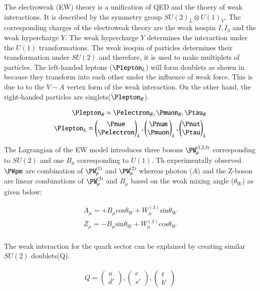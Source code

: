 The electroweak (EW) theory is a unification of QED and the thoery of weak interactions. 
It is described by the symmetry group $SU(2)_L \otimes U(1)_Y$. The corresponding
charges of the electroweak theory are the weak isospin $I,I_3$ and the weak hypercharge $Y$.
The weak hypercharge $Y$ determines the interaction under the $U(1)$ transformations.
The weak isospin of particles determines their transformation under $SU(2)$ and therefore, it is
used to make multiplets of particles. The left-handed leptons ($\Plepton_L$) will form doublets
as shown in  because they transform into each other under the influence of weak force. 
This is due to to the $V-A$ vertex form of the weak interaction. On the other hand, the right-handed 
particles are singlets($\Plepton_R$). 

\begin{align*}
    \Plepton_R = \Pelectron_R, \Pmuon_R, \Ptau_R \\
    \Plepton_L = \begin{pmatrix} \Pnue \\ \Pelectron \end{pmatrix}_L , \begin{pmatrix} \Pnum \\ \Pmuon \end{pmatrix}_L , \begin{pmatrix} \Pnut \\ \Ptau \end{pmatrix}_L 
\end{align*}

The Lagrangian of the EW model introduces three bosons $\PW_\mu^{(1,2,3)}$ corresponding
to $SU(2)$ and one $B_\mu$ corresponding to $U(1)$. Th experimentally observed $\PWpm$
are combination of $\PW_\mu^{(1)}$ and $\PW_\mu^{(2)}$ whereas photon ($A$) and the Z-boson are linear
combinations of $\PW_\mu^{(3)}$ and $B_\mu$ based on the weak mixing angle ($\theta_W$)
as given below:

\begin{align*}
A_\mu = +B_\mu \text{cos} \theta_W + W_\mu^{(3)}\text{sin} \theta_W \\
Z_\mu = -B_\mu \text{sin} \theta_W + W_\mu^{(3)}\text{cos} \theta_W \\
\end{align*}

The weak interaction for the quark sector can be explained by creating similar
$SU(2)$ doublets(Q).

\begin{align*}
    Q = \begin{pmatrix} u \\ d' \end{pmatrix}, \begin{pmatrix} c \\ s' \end{pmatrix}, \begin{pmatrix} t \\ b' \end{pmatrix}
\end{align*}

